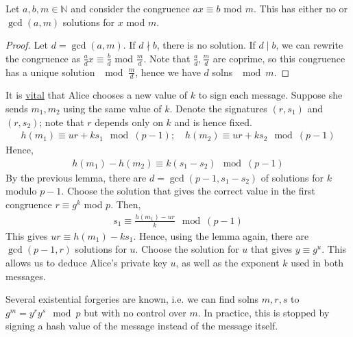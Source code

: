 \begin{lemma}
    Let $a, b, m \in \mathbb N$ and consider the congruence $ax \equiv b$ mod $m$.
    This has either no or $\gcd(a,m)$ solutions for $x$ mod $m$.
\end{lemma}

\begin{proof}
    Let $d = \gcd(a,m)$.
    If $d \nmid b$, there is no solution.
    If $d \mid b$, we can rewrite the congruence as $\frac{a}{d} x \equiv \frac{b}{d}$ mod $\frac{m}{d}$.
    Note that $\frac{a}{d}, \frac{m}{d}$ are coprime, so this congruence has a unique solution $\mod \frac{m}{d}$, hence we have $d$ solns $\mod m$.
\end{proof}

It is \underline{vital} that Alice chooses a new value of $k$ to sign each message.
Suppose she sends $m_1, m_2$ using the same value of $k$.
Denote the signatures $(r, s_1)$ and $(r, s_2)$; note that $r$ depends only on $k$ and is hence fixed.
\begin{align*}
    h(m_1) \equiv ur + ks_1 \mod (p-1);\quad h(m_2) \equiv ur + ks_2 \mod (p-1)
\end{align*}
Hence,
\begin{align*}
    h(m_1) - h(m_2) \equiv k(s_1 - s_2) \mod (p-1)
\end{align*}
By the previous lemma, there are $d = \gcd(p-1, s_1 - s_2)$ of solutions for $k$ modulo $p-1$.
Choose the solution that gives the correct value in the first congruence $r \equiv g^k$ mod $p$.
Then,
\begin{align*}
    s_1 \equiv \frac{h(m_1) - ur}{k} \mod (p-1)
\end{align*}
This gives $ur \equiv h(m_1) - ks_1$.
Hence, using the lemma again, there are $\gcd(p-1, r)$ solutions for $u$.
Choose the solution for $u$ that gives $y \equiv g^u$.
This allows us to deduce Alice's private key $u$, as well as the exponent $k$ used in both messages.

\begin{remark}
    Several existential forgeries are known, i.e. we can find solns $m, r, s$ to $g^m = y^r y^s \mod p$ but with no control over $m$.
    In practice, this is stopped by signing a hash value of the message instead of the message itself.
\end{remark}


